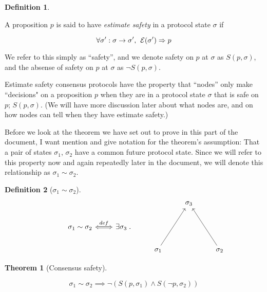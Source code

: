 \documentclass{article}
\theoremstyle{definition}
\newtheorem{thm}{Theorem}
\newtheorem{defn}{Definition}[section]
\begin{document}
\vspace{5mm}

\begin{defn}
\begin{description}
A proposition $p$ is said to have \emph{estimate safety} in a protocol state $\sigma$ if 

$$
\forall \sigma':\sigma \to \sigma',\hspace{1.5mm} \mathcal{E}(\sigma') \Rightarrow p
$$
\end{description}
\end{defn}

We refer to this simply as ``safety'', and we denote safety on $p$ at $\sigma$ as $S(p,\sigma)$, and the absense of safety on $p$ at $\sigma$ as $\neg{S(p,\sigma)}$.

Estimate safety consensus protocols have the property that ``nodes'' only make ``decisions" on a proposition $p$ when they are in a protocol state $\sigma$ that is safe on $p$; $S(p,\sigma)$. (We will have more discussion later about what nodes are, and on how nodes can tell when they have estimate safety.)

Before we look at the theorem we have set out to prove in this part of the document, I want mention and give notation for the theorem's assumption: That a pair of states $\sigma_1$, $\sigma_2$ have a common future protocol state. Since we will refer to this property now and again repeatedly later in the document, we will denote this relationship as $\sigma_1 \sim \sigma_2$.

\begin{defn}[$\sigma_1 \sim \sigma_2$]
\begin{equation*}
\begin{tikzcd}
{}
  &
{}  
  &
{}  
  &
{}
  &
\sigma_3
  &
{}
  \\
{}
  &
\sigma_1 \sim \sigma_2
  \arrow[r,Leftrightarrow, "def"]
  &
\exists \sigma_3 \hspace{1mm}. 
  &
{}  
  &
{}
  &
{}
  \\
{}  
  &
{}  
  &
{}
  &
\sigma_1
  \arrow[uur,""]
  &
{}
  &
\sigma_2
  \arrow[uul,""]
\end{tikzcd}
\end{equation*}
\end{defn}

\begin{thm}[Consensus safety]
\begin{description}
$$
\sigma_1 \sim \sigma_2 \implies \neg(S(p,\sigma_1) \land S(\neg{p},\sigma_2))
$$
\end{description}
\end{thm}
\end{document}
